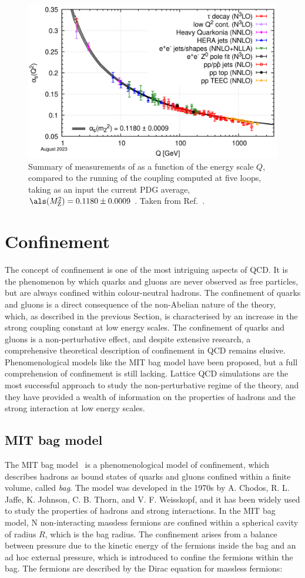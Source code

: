 \begin{figure}[htb]
    \centering
    \includegraphics[width=0.7\linewidth]{Figures/Chapter 1/Alpha_s_running.png}
    \caption{Summary of measurements of \als as a function of the energy scale $Q$, compared to the running of the coupling computed at five loops, taking as an input the current PDG average, $\als(M_\mathrm{Z}^2) = 0.1180 \pm 0.0009$ \gevcc. Taken from Ref.~\cite{pdg}.}
    \label{fig:alpha_s_running}
\end{figure}

\section{Confinement}
The concept of confinement is one of the most intriguing aspects of QCD. It is the phenomenon by which quarks and gluons are never observed as free particles, but are always confined within colour-neutral hadrons. The confinement of quarks and gluons is a direct consequence of the non-Abelian nature of the theory, which, as described in the previous Section, is characterised by an increase in the strong coupling constant at low energy scales. The confinement of quarks and gluons is a non-perturbative effect, and despite extensive research, a comprehensive theoretical description of confinement in QCD remains elusive. Phenomenological models like the MIT bag model have been proposed, but a full comprehension of confinement is still lacking. Lattice QCD simulations are the most successful approach to study the non-perturbative regime of the theory, and they have provided a wealth of information on the properties of hadrons and the strong interaction at low energy scales.

\subsection{MIT bag model}
The MIT bag model~\cite{Johnson:1975zp} is a phenomenological model of confinement, which describes hadrons as bound states of quarks and gluons confined within a finite volume, called \emph{bag}. The model was developed in the 1970s by A. Chodos, R. L. Jaffe, K. Johnson, C. B. Thorn, and V. F. Weisskopf, and it has been widely used to study the properties of hadrons and strong interactions. In the MIT bag model, N non-interacting massless fermions are confined within a spherical cavity of radius $R$, which is the bag radius. The confinement arises from a balance between pressure due to the kinetic energy of the fermions inside the bag and an ad hoc external pressure, which is introduced to confine the fermions within the bag. The fermions are described by the Dirac equation for massless fermions:

